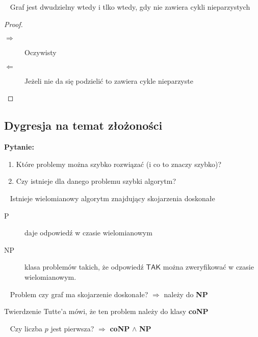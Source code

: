 \begin{theorem}~ %
Graf jest dwudzielny wtedy i tlko wtedy, gdy nie zawiera cykli nieparzystych
\end{theorem}
\begin{proof}~ %
\begin{description}
\item[$\Rightarrow$] Oczywisty
\item[$\Leftarrow$] Jeżeli nie da się podzielić to zawiera cykle nieparzyste
\end{description}
\end{proof}
\subsection{Dygresja na temat złożoności}
\textbf{Pytanie:}
\begin{enumerate}
\item Które problemy można szybko rozwiązać (i co to znaczy szybko)?
\item Czy istnieje dla danego problemu szybki algorytm?
\end{enumerate}
\begin{fact*}[Endmonds '63]~ %
Istnieje wielomianowy algorytm znajdujący skojarzenia doskonałe
\end{fact*}
\begin{description}
\item[P] daje odpowiedź w czasie wielomianowym
\item[NP] klasa problemów takich, że odpowiedź $\mathsf{TAK}$ można zweryfikować w czasie wielomianowym. 
\end{description}
\begin{example*}~ %
Problem czy graf ma skojarzenie doskonałe? $\Rightarrow$ należy do \textbf{NP}

Twierdzenie Tutte'a mówi, że ten problem należy do klasy \textbf{coNP}
\end{example*}
\begin{problem*}~ %
Czy liczba $p$ jest pierwsza? $\Rightarrow $ \textbf{coNP} $\land$ \textbf{NP}
\end{problem*}

